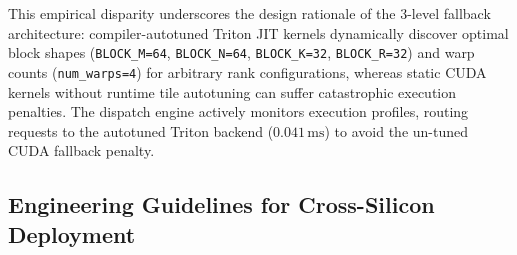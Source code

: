 This empirical disparity underscores the design rationale of the \neuralops{} 3-level fallback architecture: compiler-autotuned Triton JIT kernels dynamically discover optimal block shapes (\texttt{BLOCK\_M=64}, \texttt{BLOCK\_N=64}, \texttt{BLOCK\_K=32}, \texttt{BLOCK\_R=32}) and warp counts (\texttt{num\_warps=4}) for arbitrary rank configurations, whereas static CUDA kernels without runtime tile autotuning can suffer catastrophic execution penalties. The \neuralops{} dispatch engine actively monitors execution profiles, routing requests to the autotuned Triton backend ($0.041\,\text{ms}$) to avoid the un-tuned CUDA fallback penalty.

\subsection{Engineering Guidelines for Cross-Silicon Deployment}
\label{sec:appendix_engineering_guidelines}


